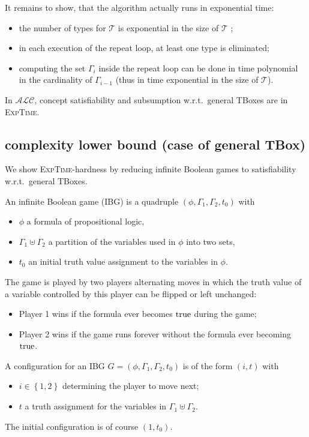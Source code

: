 It remains to show, that the algorithm actually runs in exponential time:
\begin{itemize}
	\item the number of types for $\mathcal{T}$ is exponential in the size of $\mathcal{T}$ ;
	\item in each execution of the repeat loop, at least one type is eliminated;
	\item computing the set $\Gamma_i$ inside the repeat loop can be done in time
		polynomial in the cardinality of $\Gamma_{i-1}$ (thus in time exponential in the size of $\mathcal{T}$).
\end{itemize}

\begin{theorem}
	In $\mathcal{ALC}$, concept satisfiability and subsumption w.r.t.\ general TBoxes are in \textsc{ExpTime}.
\end{theorem}

\subsection{complexity lower bound (case of general TBox)}
We show \textsc{ExpTime}-hardness by reducing infinite Boolean games to satisfiability w.r.t.\ general TBoxes.
\begin{definition*}[IBG]
	An infinite Boolean game (IBG) is a quadruple $(\phi, \Gamma_1, \Gamma_2, t_0)$ with
	\begin{itemize}
		\item  $\phi$ a formula of propositional logic,
		\item $\Gamma_1 \uplus \Gamma_2$ a partition of the variables used in $\phi$ into two sets,
		\item $t_0$ an initial truth value assignment to the variables in $\phi$.
	\end{itemize}

	The game is played by two players alternating moves
	in which the truth value of a variable controlled by this player can be flipped or left unchanged:
	\begin{itemize}
		\item Player 1 wins if the formula ever becomes $\mathit{\text{true}}$ during the game;
		\item Player 2 wins if the game runs forever without the  formula ever becoming $\mathit{\text{true}}$.
	\end{itemize}
\end{definition*}

A configuration for an IBG $G = (\phi, \Gamma_1, \Gamma_2 ,t_0)$ is of the form $(i,t)$ with
\begin{itemize}
	\item $i \in \left\{ 1,2 \right\}$ determining the player to move next;
	\item $t$ a truth assignment for the variables in $\Gamma_1 \uplus \Gamma_2$.
\end{itemize}
The initial configuration is of course $(1, t_0)$.

